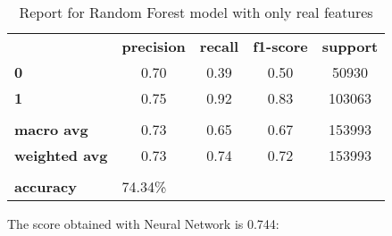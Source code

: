 \begin{table}[h!]
    \centering
    \begin{tabular}{lcccc}
        \rowcolor[HTML]{EEEEEE} 
        \cellcolor[HTML]{FBFBFB} & \textbf{precision} & \textbf{recall} & \textbf{f1-score} & \textbf{support} \\
        \rowcolor[HTML]{EEEEEE} 
        \textbf{0}               & 0.70               & 0.39            & 0.50              & 50930            \\
        \rowcolor[HTML]{EEEEEE} 
        \textbf{1}               & 0.75               & 0.92            & 0.83              & 103063           \\
        \rowcolor[HTML]{FBFBFB} 
        &                    &                 &                   &                  \\
        \rowcolor[HTML]{EEEEEE} 
        \textbf{macro avg}       & 0.73               & 0.65            & 0.67              & 153993           \\
        \rowcolor[HTML]{EEEEEE} 
        \textbf{weighted avg}    & 0.73               & 0.74            & 0.72              & 153993           \\
        \rowcolor[HTML]{FBFBFB} 
        &                    &                 &                   &                  \\
        \rowcolor[HTML]{EEEEEE} 
        \textbf{accuracy}        & \multicolumn{4}{l}{\cellcolor[HTML]{EEEEEE}74.34\%}                         
    \end{tabular}
    \caption{Report for Random Forest model with only real features}
    \label{tab:rf-res-real}
\end{table}

\newpage
The score obtained with Neural Network is 0.744:

